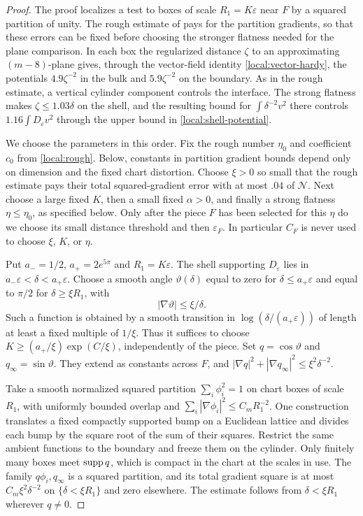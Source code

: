 \begin{proof}
The proof localizes a test to boxes of scale $R_1=K\varepsilon$ near
$F$ by a squared partition of unity. The rough estimate of
 pays for the partition gradients, so that these
errors can be fixed before choosing the stronger flatness needed for
the plane comparison. In each box the regularized distance $\zeta$ to
an approximating $(m-8)$-plane gives, through the vector-field identity
\eqref{local:vector-hardy}, the potentials $4.9\zeta^{-2}$ in the bulk
and $5.9\zeta^{-2}$ on the boundary. As in the rough estimate, a vertical
cylinder component controls the interface. The strong flatness makes
$\zeta\le1.03\delta$ on the shell, and the resulting bound for
$\int\delta^{-2}v^2$ there controls $1.16\int D_\varepsilon v^2$ through
the upper bound in \eqref{local:shell-potential}.

We choose the parameters in this order.  Fix the rough number $\eta_0$
and coefficient $c_0$ from \cref{local:rough}.  Below, constants in
partition gradient bounds depend only on dimension and the fixed
chart distortion.  Choose $\xi>0$ so small that the rough estimate
pays their total squared-gradient error with at most $.04$ of
$\mathcal N$.  Next choose a large fixed $K$, then a small fixed
$\alpha>0$, and finally a strong flatness $\eta\le\eta_0$, as
specified below.  Only after the piece $F$ has been selected for
this $\eta$ do we choose its small distance threshold and then
$\varepsilon_F$.  In particular $C_F$ is never used to choose
$\xi$, $K$, or $\eta$.

Put $a_-=1/2$, $a_+=2e^{5\pi}$ and $R_1=K\varepsilon$.
The shell supporting $D_\varepsilon$ lies in
$a_-\varepsilon<\delta<a_+\varepsilon$.
Choose a smooth angle $\vartheta(\delta)$ equal to zero for
$\delta\le a_+\varepsilon$ and equal to $\pi/2$ for
$\delta\ge\xi R_1$, with
\[
 |\nabla\vartheta|\le\xi/\delta.
\]
Such a function is obtained by a smooth transition in
$\log(\delta/(a_+\varepsilon))$ of length at least a fixed multiple
of $1/\xi$.  Thus it suffices to choose
$K\ge (a_+/\xi)\exp(C/\xi)$, independently of the piece.  Set
$q=\cos\vartheta$ and $q_\infty=\sin\vartheta$.
They extend as constants across $F$, and
$|\nabla q|^2+|\nabla q_\infty|^2\le\xi^2\delta^{-2}$.

Take a smooth normalized squared partition $\sum_i\phi_i^2=1$
on chart boxes of scale $R_1$, with uniformly bounded overlap and
$\sum_i|\nabla\phi_i|^2\le C_mR_1^{-2}$.
One construction translates a fixed compactly supported bump on a
Euclidean lattice and divides each bump by the square root of the
sum of their squares.  Restrict the same ambient functions to the
boundary and freeze them on the cylinder.  Only finitely many boxes
meet $\operatorname{supp} q$, which is compact in the chart at the scales in use.
The family $q\phi_i,q_\infty$ is a squared partition, and its total
gradient square is at most $C_m\xi^2\delta^{-2}$ on
$\{\delta<\xi R_1\}$ and zero elsewhere.  The estimate follows
from $\delta<\xi R_1$ wherever $q\ne0$.


\end{proof}
